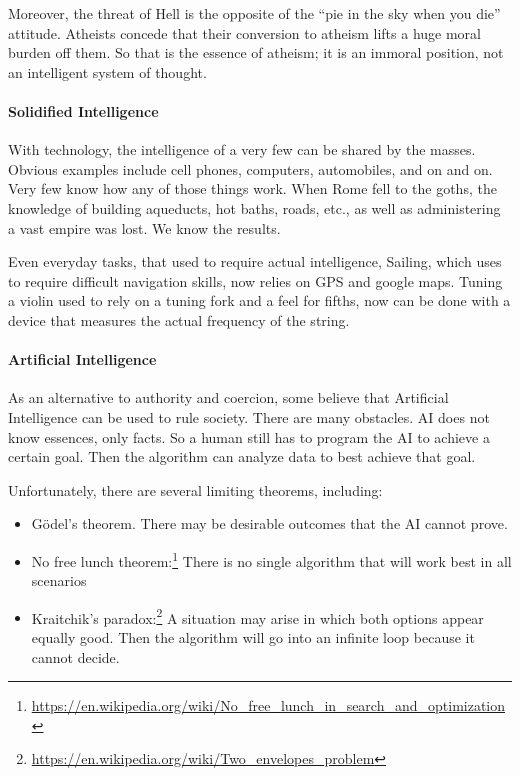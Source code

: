 Moreover, the threat of Hell is the opposite of the ``pie in the sky when you die'' attitude. Atheists concede that their conversion to atheism lifts a huge moral burden off them. So that is the essence of atheism; it is an immoral position, not an intelligent system of thought.

\paragraph{Solidified Intelligence}


With technology, the intelligence of a very few can be shared by the masses. Obvious examples include cell phones, computers, automobiles, and on and on. Very few know how any of those things work. When Rome fell to the goths, the knowledge of building aqueducts, hot baths, roads, etc., as well as administering a vast empire was lost. We know the results.

Even everyday tasks, that used to require actual intelligence, Sailing, which uses to require difficult navigation skills, now relies on GPS and google maps. Tuning a violin used to rely on a tuning fork and a feel for fifths, now can be done with a device that measures the actual frequency of the string.

\paragraph{Artificial Intelligence}


As an alternative to authority and coercion, some believe that Artificial Intelligence can be used to rule society. There are many obstacles. AI does not know essences, only facts. So a human still has to program the AI to achieve a certain goal. Then the algorithm can analyze data to best achieve that goal.

Unfortunately, there are several limiting theorems, including:

\begin{itemize}


\item Gödel's theorem. There may be desirable outcomes that the AI cannot prove.

\item No free lunch theorem:\footnote{\url{https://en.wikipedia.org/wiki/No\_free\_lunch\_in\_search\_and\_optimization}} There is no single algorithm that will work best in all scenarios

\item Kraitchik's paradox:\footnote{\url{https://en.wikipedia.org/wiki/Two\_envelopes\_problem}} A situation may arise in which both options appear equally good. Then the algorithm will go into an infinite loop because it cannot decide.
\end{itemize}


